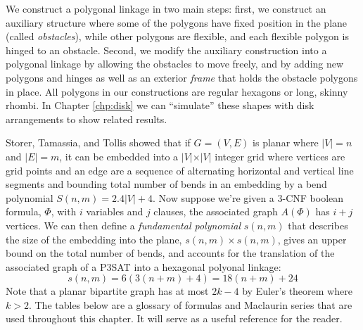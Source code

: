 \documentclass[10pt]{CSUNthesis}
\theoremstyle{plain}%
\theoremstyle{definition}
\theoremstyle{remark}
\newcommand{\lr}[1]{\left( #1 \right)}
\newcommand{\vlr}[1]{\left\vert #1 \right\vert}
\begin{document}
We construct a polygonal linkage in two main steps: first, we construct an auxiliary structure where some of the polygons have fixed position in the plane (called \emph{obstacles}), while other polygons are flexible, and each flexible polygon is hinged to an obstacle. 
Second, we modify the auxiliary construction into a polygonal linkage by allowing the obstacles to move freely, and by adding new polygons and hinges as well as an exterior \emph{frame} that holds the obstacle polygons in place.
All polygons in our constructions are regular hexagons or long, skinny rhombi.
In Chapter \ref{chp:disk} we can ``simulate'' these shapes with disk arrangements to show related results.

Storer, Tamassia, and Tollis \cite{storer1984minimal,tamassia1987efficient} showed that if $G=(V,E)$ is planar where $\vlr{V}=n$ and $\vlr{E} = m$, it can be embedded into a $\vert V \vert \times \vert V \vert$ integer grid where vertices are grid points and an edge are a sequence of alternating horizontal and vertical line segments and bounding total number of bends in an embedding by a bend polynomial $S(n,m)=2.4 \vert V\vert + 4$.  
Now suppose we're given a 3-CNF boolean formula, $\Phi$, with $i$ variables and $j$ clauses, the associated graph $A(\Phi)$ has $i+j$ vertices.  
We can then define a \textit{fundamental polynomial} $s(n,m)$ that describes the size of the embedding into the plane, $s(n,m) \times s(n,m)$, gives an upper bound on the total number of bends, and accounts for the translation of the associated graph of a P3SAT into a hexagonal polyonal linkage:
$$s(n,m) = 6\lr{3 (n+m) + 4} = 18 (n+m) + 24$$
Note that a planar bipartite graph has at most $2k-4$ by Euler's theorem where $k>2$.  
The tables below are a glossary of formulas and Maclaurin series that are used throughout this chapter.
It will serve as a useful reference for the reader.
\end{document}
